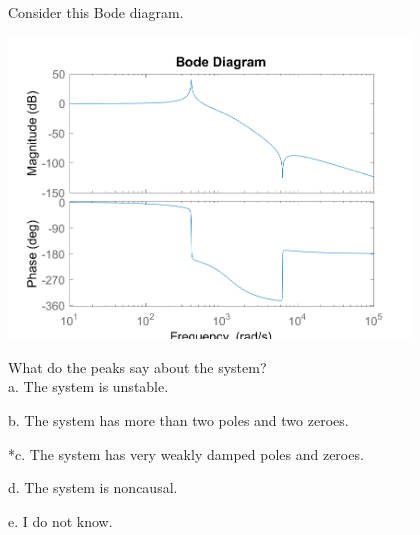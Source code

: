 
Consider this Bode diagram.

\includegraphics[width=4.2058in,height=3.15315in]{../../Images/BodeDiagramQ2.png}

What do the peaks say about the system?\\

a. The system is unstable.

b. The system has more than two poles and two zeroes.

*c. The system has very weakly damped poles and zeroes.

d. The system is noncausal.

e. I do not know.\\
